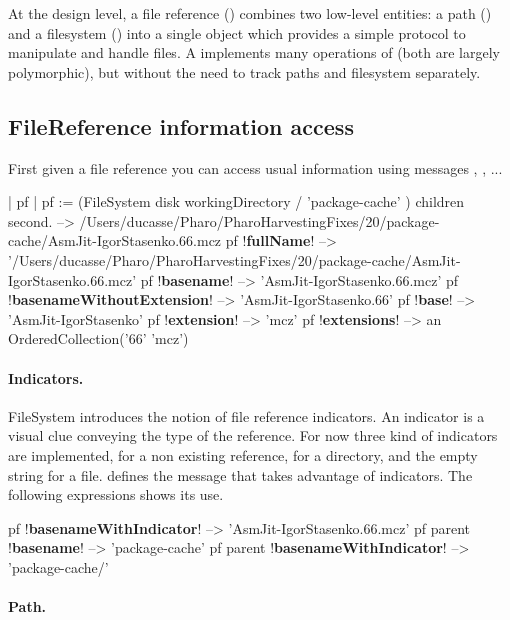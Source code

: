 \documentclass[a4paper,10pt,twoside]{book}
\begin{document}
At the design level, a file reference () combines two low-level entities: a path () and a filesystem () into a single object which provides a simple protocol to manipulate and handle files. A  implements many operations of  (both are largely polymorphic), but without the need to track paths and filesystem separately.

\subsection{FileReference information access}
First given a file reference you can access usual information using messages , , ...

\begin{code}{}
| pf |
pf := (FileSystem disk workingDirectory / 'package-cache' ) children second.
  -->  /Users/ducasse/Pharo/PharoHarvestingFixes/20/package-cache/AsmJit-IgorStasenko.66.mcz
pf !\textbf{fullName}!
  --> '/Users/ducasse/Pharo/PharoHarvestingFixes/20/package-cache/AsmJit-IgorStasenko.66.mcz'
pf !\textbf{basename}!
  --> 'AsmJit-IgorStasenko.66.mcz'  
pf !\textbf{basenameWithoutExtension}! 
  -->	'AsmJit-IgorStasenko.66'
pf !\textbf{base}! 
	--> 'AsmJit-IgorStasenko'
pf !\textbf{extension}! 
    --> 'mcz'
pf !\textbf{extensions}!
	--> an OrderedCollection('66' 'mcz')
\end{code}


\paragraph{Indicators.} 
FileSystem introduces the notion of file reference indicators. An indicator is a visual clue conveying the type of the reference.
For now three kind of indicators are implemented,   for a non existing reference,  for a directory,
and the empty string for a file.  defines the  message  that takes advantage of indicators.
The following expressions shows its use. 


\begin{code}{}
pf  !\textbf{basenameWithIndicator}!
	--> 'AsmJit-IgorStasenko.66.mcz'
pf parent  !\textbf{basename}!
	--> 'package-cache'
pf parent !\textbf{basenameWithIndicator}!
	--> 'package-cache/'
\end{code}


\paragraph{Path.}
\end{document}
